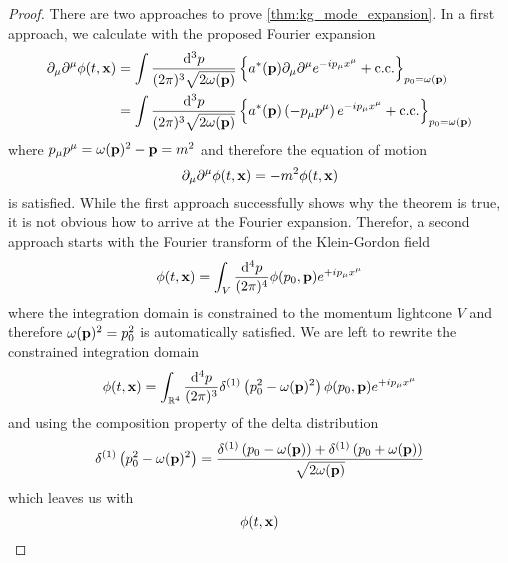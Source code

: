 \kgmodeexp
\begin{proof}
	There are two approaches to prove \cref{thm:kg_mode_expansion}.
	In a first approach, we calculate with the proposed Fourier expansion
	\begin{equation*}
		\begin{split}
			\partial_\mu
			\partial^\mu
			\phi(t,\vb{x})
			&=
			\int\frac{\dd[3]{p}}{(2\pi)^3\sqrt{2\omega(\vb{p})}}
			\left\{
				a^*(\vb{p})
				\partial_\mu
				\partial^\mu
				e^{-ip_\mu x^\mu}
				+
				\text{c.c.}
			\right\}_{p_0=\omega(\vb{p})}
			\\
			&=
			\int\frac{\dd[3]{p}}{(2\pi)^3\sqrt{2\omega(\vb{p})}}
			\left\{
				a^*(\vb{p})
				\left(
					-
					p_\mu
					p^\mu
				\right)
				e^{-ip_\mu x^\mu}
				+
				\text{c.c.}
			\right\}_{p_0=\omega(\vb{p})}
		\end{split}
	\end{equation*}
	where $p_\mu p^\mu=\omega(\vb{p})^2-\vb{p}=m^2$ and therefore the equation of motion
	\begin{equation*}
			\partial_\mu
			\partial^\mu
			\phi(t,\vb{x})
			=
			-
			m^2
			\phi(t,\vb{x})
	\end{equation*}
	is satisfied.
	While the first approach successfully shows why the theorem is true, it is not obvious how to arrive at the Fourier expansion.
	Therefor, a second approach starts with the Fourier transform of the Klein-Gordon field
	\begin{equation*}
		\phi(t,\vb{x})
		=
		\int_V\frac{\dd[4]{p}}{(2\pi)^4}
		\phi(p_0,\vb{p})
		e^{+ip_\mu x^\mu}
	\end{equation*}
	where the integration domain is constrained to the momentum lightcone $V$ and therefore $\omega(\vb{p})^2=p_0^2$ is automatically satisfied.
	We are left to rewrite the constrained integration domain
	\begin{equation*}
		\phi(t,\vb{x})
		=
		\int_{\mathbb{R}^4}\frac{\dd[4]{p}}{(2\pi)^3}
		\delta^{(1)}\left(p_0^2-\omega(\vb{p})^2\right)
		\phi(p_0,\vb{p})
		e^{+ip_\mu x^\mu}
	\end{equation*}
	and using the composition property of the delta distribution
	\begin{equation*}
		\delta^{(1)}\left(p_0^2-\omega(\vb{p})^2\right)
		=
		\frac{
			\delta^{(1)}\left(p_0-\omega(\vb{p})\right)
			+
			\delta^{(1)}\left(p_0+\omega(\vb{p})\right)
		}{\sqrt{2\omega(\vb{p})}}
	\end{equation*}
	which leaves us with
	\begin{equation*}
		\phi(t,\vb{x})

\end{equation*}
\end{proof}

